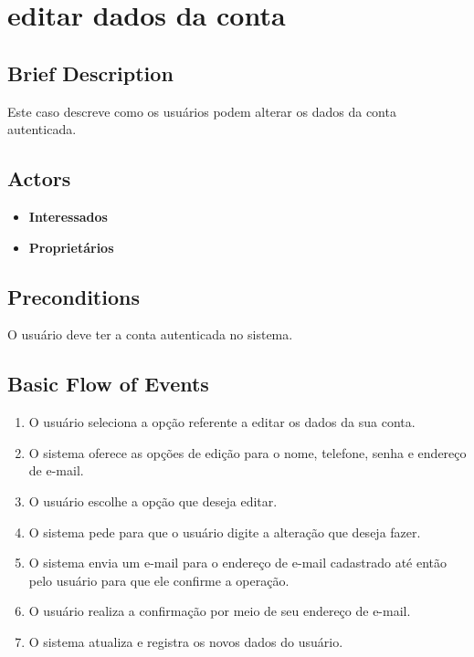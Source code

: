 \section{editar dados da conta}

\subsection*{Brief Description}
Este caso descreve como os usuários podem alterar os dados da conta autenticada.

\subsection*{Actors}

\begin{itemize}
    \item \textbf{Interessados}
    \item \textbf{Proprietários}
\end{itemize}

\subsection*{Preconditions}
O usuário deve ter a conta autenticada no sistema.

\subsection*{Basic Flow of Events}

\begin{enumerate}
    \item  O usuário seleciona a opção referente a editar os dados da sua conta.
    \item O sistema oferece as opções de edição para o nome, telefone, senha e endereço de e-mail.
    \item O usuário escolhe a opção que deseja editar.
    \item O sistema pede para que o usuário digite a alteração que deseja fazer.
    \item O sistema envia um e-mail para o endereço de e-mail cadastrado até então pelo usuário para
    que ele confirme a operação.
    \item O usuário realiza a confirmação por meio de seu endereço de e-mail.
    \item O sistema atualiza e registra os novos dados do usuário.
\end{enumerate}


